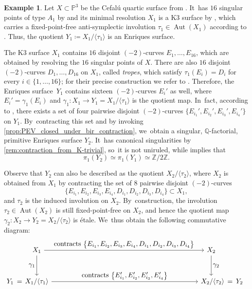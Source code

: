 \documentclass[JEP,XML,SOM,Unicode,published]{cedram}
\let\ts\textstyle
\theoremstyle{plain}
\theoremstyle{definition}
\newtheorem{exa}[thm]{Example}
\newcommand{\Z}{\mathbb{Z}}
\newcommand{\Q}{\mathbb{Q}}
\renewcommand{\P}{\mathbb{P}}
\DeclareMathOperator{\Aut}{Aut}
\begin{document}
\begin{exa}
\label{example:Catanese}
Let $X \subset \P^3$ be the Cefalú quartic surface from \cite[Th.\,1]{Catanese2023}. It~has $16$ singular points of type $A_1$ by \cite[Th.\,1(ii)]{Catanese2023} and its minimal resolution $X_1$ is a K3 surface by \cite[Th.\,1(ix)]{Catanese2023}, which carries a fixed-point-free anti-symplectic involution $\tau_1 \in \Aut(X_1)$ according to \cite[Th.\,1(v) \& (vii)]{Catanese2023}. Thus, the quotient $Y_1 \coloneqq X_1 / \langle \tau_1 \rangle$ is an Enriques surface.

The K3 surface $X_1$ contains $16$ disjoint $(-2)$-curves $E_1,\dots, E_{16}$, which are obtained by resolving the $16$ singular points of $X$.
There are also $16$ disjoint $(-2)$-curves $D_1,\dots,D_{16}$ on $X_1$, called \emph{tropes}, which satisfy $\tau_1(E_i)=D_i$ for every $i \in \{1, \dots, 16\}$; for their precise construction we refer to \cite[\S 7]{Catanese2023}. Therefore, the Enriques \hbox{surface}~$Y_1$ contains sixteen $(-2)$-curves $E_i'$ as well, where $E_i' = \gamma_1(E_i)$ and $\gamma_1 \colon X_1\!\to\! Y_1 = X_1 / \langle \tau_1 \rangle$ is the quotient map. In~fact, according to \cite[Cor.\,30]{Catanese2023}, there exists a set of four pairwise disjoint $(-2)$-curves $ \bigl\{E_{i_1}',E_{i_2}',E_{i_3}',E_{i_4}' \bigr\}$ on $Y_1$. By~contracting this set and by invoking \autoref{prop:PEV_closed_under_bir_contraction}, we~obtain a singular, $\Q$\nobreakdash-factorial, primitive Enriques surface $Y_2$. It~has canonical singularities by \autoref{rem:contraction_from_K-trivial}, so~it is not uniruled, while \cite[Th.\,1.1]{Tak03} implies that
\[
\pi_1(Y_2) \simeq \pi_1(Y_1) \simeq \Z / 2\Z.
\]

Observe that $Y_2$ can also be described as the quotient $X_2 / \langle \tau_2 \rangle$, where $X_2$ is obtained from $X_1$ by contracting the set of $8$ pairwise disjoint $(-2)$-curves
\[
\bigl\{ E_{i_1},E_{i_2},E_{i_3},E_{i_4}, D_{i_1},D_{i_2},D_{i_3},D_{i_4} \bigr\} \subset X_1,
\]
and $\tau_2$ is the induced involution on $X_2$. By~construction, the involution $\tau_2 \in \Aut(X_2)$ is still fixed-point-free on $X_2$, and hence the quotient map $ \gamma_2 \colon X_2 \to Y_2 = X_2 / \langle \tau_2 \rangle$ is étale. We~thus obtain the following commutative diagram:
\[
\begin{tikzcd}[row sep = 3em, column sep = large, /tikz/column 1/.append style={column sep = 0pt, inner xsep = 0pt}, /tikz/column 8/.append style={column sep = 0pt}]
& X_1 \arrow[d, "\ts \gamma_1" swap] \arrow[rrrrrr, "\ts {\text{contracts }
\bigl\{E_{i_1},E_{i_2},E_{i_3},E_{i_4},D_{i_1},D_{i_2},D_{i_3},D_{i_4} \bigr\} }"] & & & & & & X_2 \arrow[d, "\ts \gamma_2"] \\
Y_1 \hspace{2pt} =
& X_1 / \langle \tau_1 \rangle \arrow[rrrrrr, "\ts {\text{contracts } \bigl\{E'_{i_1},E'_{i_2},E'_{i_3},E'_{i_4} \bigr\} }"] & & & & & & X_2 / \langle \tau_2 \rangle \hspace{-4pt} & = \hspace{2pt} Y_2
\end{tikzcd}
\]


\end{exa}
\end{document}
